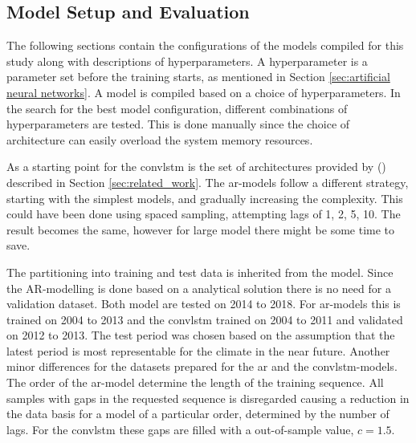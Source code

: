 \subsection{Model Setup and Evaluation}
The following sections contain the configurations of the models compiled for this study along with descriptions of hyperparameters. A hyperparameter is a parameter set before the training starts, as mentioned in Section \ref{sec:artificial neural networks}. A model is compiled based on a choice of hyperparameters. In the search for the best model configuration, different combinations of hyperparameters are tested. This is done manually since the choice of architecture can easily overload the system memory resources.
 
As a starting point for the \acrshort{convlstm} is the set of architectures provided by \citeauthor{SunAirLSTM} (\citeyear{SunAirLSTM}) described in Section \ref{sec:related_work}. The \acrshort{ar}-models follow a different strategy, starting with the simplest models, and gradually increasing the complexity. This could have been done using spaced sampling, attempting lags of 1, 2, 5, 10. The result becomes the same, however for large model there might be some time to save.

The partitioning into training and test data is inherited from the model. Since the AR-modelling is done based on a analytical solution there is no need for a validation dataset. Both model are tested on 2014 to 2018. For \acrshort{ar}-models this is trained on 2004 to 2013 and the \acrshort{convlstm} trained on  2004 to 2011 and validated on  2012 to 2013. The test period was chosen based on the assumption that the latest period is most representable for the climate in the near future. Another minor differences for the datasets prepared for the \acrshort{ar} and the \acrshort{convlstm}-models. The order of the \acrshort{ar}-model determine the length of the training sequence. All samples with gaps in the requested sequence is disregarded causing a reduction in the data basis for a model of a particular order, determined by the number of lags. For the \acrshort{convlstm} these gaps are filled with a out-of-sample value, $c=1.5$. 

